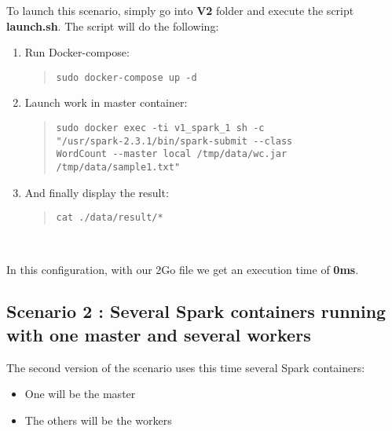\documentclass{article}
\begin{document}
To launch this scenario, simply go into \textbf{V2} folder and execute the script \textbf{launch.sh}. The script will do the following:
\begin{enumerate}
    \item Run Docker-compose:
    \begin{quote}
\begin{verbatim}
sudo docker-compose up -d
\end{verbatim}
    \end{quote}
    
    \item Launch work in master container:
    \begin{quote}
\begin{verbatim}
sudo docker exec -ti v1_spark_1 sh -c 
"/usr/spark-2.3.1/bin/spark-submit --class 
WordCount --master local /tmp/data/wc.jar 
/tmp/data/sample1.txt"
\end{verbatim}
    \end{quote}
    
    \item And finally display the result:
    \begin{quote}
\begin{verbatim}
cat ./data/result/*
\end{verbatim}
    \end{quote}
\end{enumerate}
\ \

\noindent In this configuration, with our 2Go file we get an execution time of \textbf{0ms}.



\subsection{Scenario 2 : Several Spark containers running with one master and several workers}

The second version of the scenario uses this time several Spark containers:
\begin{itemize}
  \item One will be the master
  \item The others will be the workers
\end{itemize}
\ \
\end{document}
